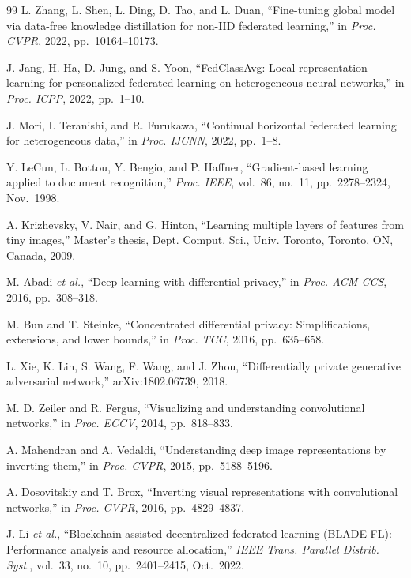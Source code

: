 \documentclass[10pt,journal]{IEEEtran}
\begin{document}
\begin{thebibliography}{99}
L. Zhang, L. Shen, L. Ding, D. Tao, and L. Duan, ``Fine-tuning global model via data-free knowledge distillation for non-IID federated learning,'' in \emph{Proc. CVPR}, 2022, pp.~10164--10173.

J. Jang, H. Ha, D. Jung, and S. Yoon, ``FedClassAvg: Local representation learning for personalized federated learning on heterogeneous neural networks,'' in \emph{Proc. ICPP}, 2022, pp.~1--10.

J. Mori, I. Teranishi, and R. Furukawa, ``Continual horizontal federated learning for heterogeneous data,'' in \emph{Proc. IJCNN}, 2022, pp.~1--8.

Y. LeCun, L. Bottou, Y. Bengio, and P. Haffner, ``Gradient-based learning applied to document recognition,'' \emph{Proc. IEEE}, vol.~86, no.~11, pp.~2278--2324, Nov.~1998.

A. Krizhevsky, V. Nair, and G. Hinton, ``Learning multiple layers of features from tiny images,'' Master's thesis, Dept. Comput. Sci., Univ. Toronto, Toronto, ON, Canada, 2009.

M. Abadi \emph{et al.}, ``Deep learning with differential privacy,'' in \emph{Proc. ACM CCS}, 2016, pp.~308--318.

M. Bun and T. Steinke, ``Concentrated differential privacy: Simplifications, extensions, and lower bounds,'' in \emph{Proc. TCC}, 2016, pp.~635--658.

L. Xie, K. Lin, S. Wang, F. Wang, and J. Zhou, ``Differentially private generative adversarial network,'' arXiv:1802.06739, 2018.

M. D. Zeiler and R. Fergus, ``Visualizing and understanding convolutional networks,'' in \emph{Proc. ECCV}, 2014, pp.~818--833.

A. Mahendran and A. Vedaldi, ``Understanding deep image representations by inverting them,'' in \emph{Proc. CVPR}, 2015, pp.~5188--5196.

A. Dosovitskiy and T. Brox, ``Inverting visual representations with convolutional networks,'' in \emph{Proc. CVPR}, 2016, pp.~4829--4837.

J. Li \emph{et al.}, ``Blockchain assisted decentralized federated learning (BLADE-FL): Performance analysis and resource allocation,'' \emph{IEEE Trans. Parallel Distrib. Syst.}, vol.~33, no.~10, pp.~2401--2415, Oct.~2022.

\end{thebibliography}
\end{document}
